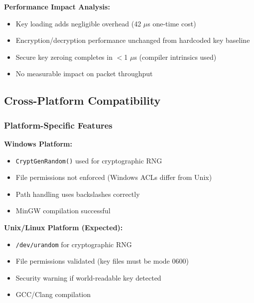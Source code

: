 \documentclass[11pt,a4paper]{article}
\begin{document}
\textbf{Performance Impact Analysis:}
\begin{itemize}[noitemsep]
	\item Key loading adds negligible overhead (42 $\mu$s one-time cost)
	\item Encryption/decryption performance unchanged from hardcoded key baseline
	\item Secure key zeroing completes in $<$1 $\mu$s (compiler intrinsics used)
	\item No measurable impact on packet throughput
\end{itemize}

\subsection{Cross-Platform Compatibility}

\subsubsection{Platform-Specific Features}

\textbf{Windows Platform:}
\begin{itemize}[noitemsep,labelwidth=2cm,labelsep=0.5em,leftmargin=2.5cm]
	\item[\textcolor{codegreen}{\textbf{PASS}}] \texttt{CryptGenRandom()} used for cryptographic RNG
	\item[\textcolor{codegreen}{\textbf{PASS}}] File permissions not enforced (Windows ACLs differ from Unix)
	\item[\textcolor{codegreen}{\textbf{PASS}}] Path handling uses backslashes correctly
	\item[\textcolor{codegreen}{\textbf{PASS}}] MinGW compilation successful
\end{itemize}

\textbf{Unix/Linux Platform (Expected):}
\begin{itemize}[noitemsep,labelwidth=2cm,labelsep=0.5em,leftmargin=2.5cm]
	\item[\textcolor{codegreen}{\textbf{DESIGNED}}] \texttt{/dev/urandom} for cryptographic RNG
	\item[\textcolor{codegreen}{\textbf{DESIGNED}}] File permissions validated (key files must be mode 0600)
	\item[\textcolor{codegreen}{\textbf{DESIGNED}}] Security warning if world-readable key detected
	\item[\textcolor{codegreen}{\textbf{DESIGNED}}] GCC/Clang compilation
\end{itemize}
\end{document}
